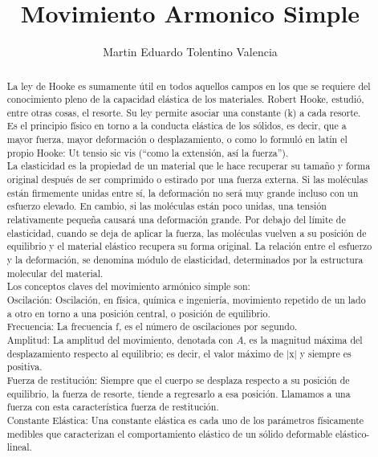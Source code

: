 \documentclass[11pt,a4paper]{article}
\author{Martin Eduardo Tolentino Valencia }
\title{Movimiento Armonico Simple}
\begin{document}
\maketitle


\begin{abstract}La ley de Hooke es sumamente útil en todos aquellos campos en los que se requiere del conocimiento pleno de la capacidad elástica de los materiales. Robert Hooke, estudió, entre otras cosas, el resorte. Su ley permite asociar una constante (k) a cada resorte. Es el principio físico en torno a la conducta elástica de los sólidos, es decir, que a mayor fuerza, mayor deformación o desplazamiento, o como lo formuló en latín el propio Hooke: Ut tensio sic vis (“como la extensión, así la fuerza”).\\La elasticidad es la propiedad de un material que le hace recuperar su tamaño y forma original después de ser comprimido o estirado por una fuerza externa. Si las moléculas están firmemente unidas entre sí, la deformación no será muy grande incluso con un esfuerzo elevado. En cambio, si las moléculas están poco unidas, una tensión relativamente pequeña causará una deformación grande. Por debajo del límite de elasticidad, cuando se deja de aplicar la fuerza, las moléculas vuelven a su posición de equilibrio y el material elástico recupera su forma original. La relación entre el esfuerzo y la deformación, se denomina módulo de elasticidad, determinados por la estructura molecular del material.\\Los conceptos claves del movimiento armónico simple son:\\Oscilación: Oscilación, en física, química e ingeniería, movimiento repetido de un lado a otro en torno a una posición central, o posición de equilibrio.\\ Frecuencia: La frecuencia f, es el número de oscilaciones por segundo.\\
 Amplitud: La amplitud del movimiento, denotada con $A$, es la magnitud máxima del desplazamiento respecto al equilibrio; es decir, el valor máximo de |x| y siempre es positiva.\\ 
 Fuerza de restitución: Siempre que el cuerpo se desplaza respecto a su posición de equilibrio, la fuerza de resorte, tiende a regresarlo a esa posición. Llamamos a una fuerza con esta característica fuerza de restitución.\\
 Constante Elástica: Una constante elástica es cada uno de los parámetros físicamente medibles que caracterizan el comportamiento elástico de un sólido deformable elástico-lineal.\end{abstract}
\end{document}
